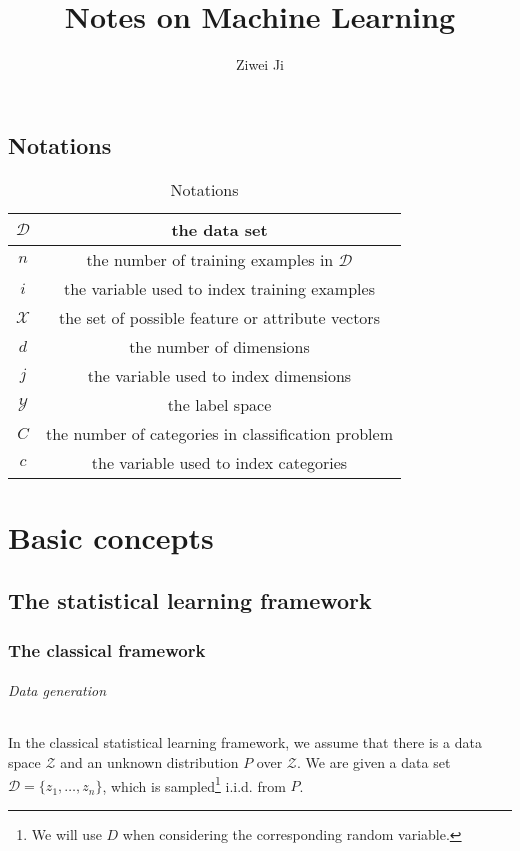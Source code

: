 \documentclass[openany]{book}
\author{Ziwei Ji}
\title{Notes on Machine Learning}
\theoremstyle{definition}
\theoremstyle{remark}
\begin{document}
\maketitle

\tableofcontents

\chapter*{Notations}
\begin{table}[h]
    \centering
\begin{tabular}{|c|c|}
\hline
$\mathcal{D}$ & the data set \\
\hline
$n$ & the number of training examples in $\mathcal{D}$ \\
\hline
$i$ & the variable used to index training examples \\
\hline
$\mathcal{X}$ & the set of possible feature or attribute vectors \\
\hline
$d$ & the number of dimensions \\
\hline
$j$ & the variable used to index dimensions \\
\hline
$\mathcal{Y}$ & the label space \\
\hline
$C$ & the number of categories in classification problem \\
\hline
$c$ & the variable used to index categories \\
\hline
\end{tabular}
\caption{Notations}
\end{table}

\part{Basic concepts}
\chapter{The statistical learning framework}
\section{The classical framework}
\paragraph{Data generation}
In the classical statistical learning framework, we assume that there is a data space $\mathcal{Z}$ and an unknown distribution $P$ over $\mathcal{Z}$. We are given a data set $\mathcal{D}=\{z_1,\ldots,z_n\}$, which is sampled\footnote{We will use $D$ when considering the corresponding random variable.} i.i.d. from $P$.
\end{document}
